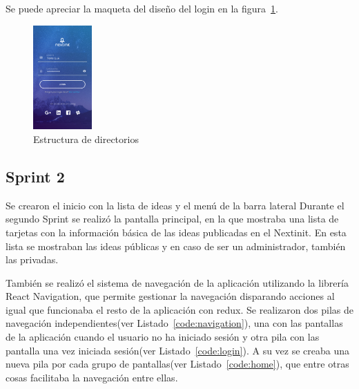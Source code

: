 Se puede apreciar la maqueta del diseño del login en la figura~\ref{fig:mklogin}.

\begin{figure}[!h]
	\begin{center}
		\includegraphics[width=0.2\textwidth]{./img/resultados/moklogin.png}
		\caption{Estructura de directorios}
		\label{fig:mklogin}
	\end{center}
\end{figure}

\subsection{Sprint 2}

Se crearon el inicio con la lista de ideas y el menú de la barra lateral
Durante el segundo Sprint se realizó la pantalla principal, en la que mostraba una lista de tarjetas con la 
información básica de las ideas publicadas en el Nextinit. En esta lista se mostraban las ideas públicas y 
en caso de ser un administrador, también las privadas.

También se realizó el sistema de navegación de la aplicación utilizando la librería React Navigation, que
 permite gestionar la navegación disparando acciones al igual que funcionaba el resto de la aplicación con redux. Se realizaron dos 
pilas de navegación independientes(ver Listado~\ref{code:navigation}), una con las pantallas de la aplicación cuando el usuario no ha iniciado 
sesión y otra pila con las pantalla una vez iniciada sesión(ver Listado~\ref{code:login}). A su vez se creaba una nueva pila por cada grupo de pantallas(ver Listado~\ref{code:home}),
que entre otras cosas facilitaba la navegación entre ellas.






